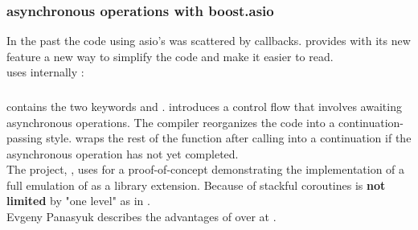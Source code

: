 \subsubsection*{asynchronous operations with boost.asio}
In the past the code using asio's \asyncops was scattered by callbacks.
\boostasio provides with its new \asyncres feature a new way to simplify the
code and make it easier to read.\\
\yieldcontext uses internally \boostcoroutine:

\subsubsection*{\csharp \await}
\csharp contains the two keywords \async and \await. \async introduces a
control flow that involves awaiting asynchronous operations. The compiler
reorganizes the code into a continuation-passing style. \await wraps the rest
of the function after calling \await into a continuation if the asynchronous
operation has not yet completed.\\
The project, \awaitemu, uses \boostcoroutine for a proof-of-concept
demonstrating the implementation of a full emulation of \csharp \await as a
library extension. Because of stackful coroutines \await is \textbf{not limited}
by "one level" as in \csharp.\\
Evgeny Panasyuk describes the advantages of \boostcoroutine over \await at
\channelnine.
